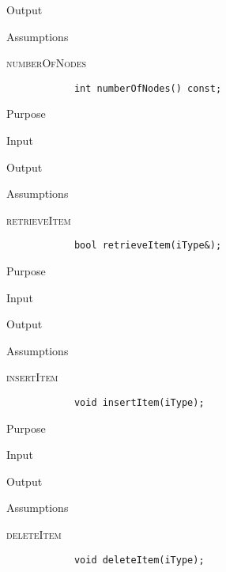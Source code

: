 \documentclass[pdftex, 12pt]{article}
\begin{document}
\begin{description}
\begin{description}
			\item{Output}

			\item{Assumptions}

		\end{description}
	\item{\textsc{numberOfNodes}}
		\begin{lstlisting}
			int numberOfNodes() const;
		\end{lstlisting}
		\begin{description}

			\item{Purpose}

			\item{Input}

			\item{Output}

			\item{Assumptions}

		\end{description}
	\item{\textsc{retrieveItem}}
		\begin{lstlisting}
			bool retrieveItem(iType&);
		\end{lstlisting}
		\begin{description}

			\item{Purpose}

			\item{Input}

			\item{Output}

			\item{Assumptions}

		\end{description}
	\item{\textsc{insertItem}}
		\begin{lstlisting}
			void insertItem(iType);
		\end{lstlisting}
		\begin{description}

			\item{Purpose}

			\item{Input}

			\item{Output}

			\item{Assumptions}

		\end{description}
	\item{\textsc{deleteItem}}
		\begin{lstlisting}
			void deleteItem(iType);
		\end{lstlisting}
		\begin{description}


\end{description}
\end{description}
\end{document}
